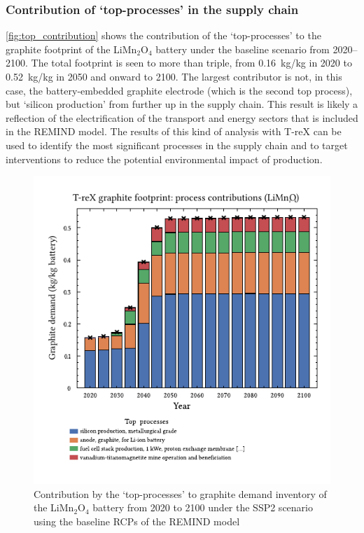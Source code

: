 \documentclass[a4paper,fleqn]{cas-dc}
\begin{document}
\subsubsection{Contribution of `top-processes' in the supply chain}%

\autoref{fig:top_contribution} shows the contribution of the `top-processes' to the graphite footprint of the  LiMn\(_2\)O\(_4\) battery under the baseline scenario from 2020--2100. The total footprint is seen to more than triple, from 0.16~kg/kg in 2020 to 0.52~kg/kg in 2050 and onward to 2100. The largest contributor is not, in this case, the battery-embedded graphite electrode (which is the second top process), but `silicon production' from further up in the supply chain. This result is likely a reflection of the electrification of the transport and energy sectors that is included in the REMIND model. The results of this kind of analysis with T-reX can be used to identify the most significant processes in the supply chain and to target interventions to reduce the potential environmental impact of production.

\begin{figure}
	\centering
	\includegraphics[width=0.9\columnwidth]{figures/T-reX-wastefootprint-processcontributions.pdf}
	\caption{Contribution by the `top-processes' to graphite demand inventory of the LiMn\(_2\)O\(_4\) battery from 2020 to 2100 under the SSP2 scenario using the baseline RCPs of the REMIND model}\label{fig:top_contribution}
\end{figure}
\end{document}
